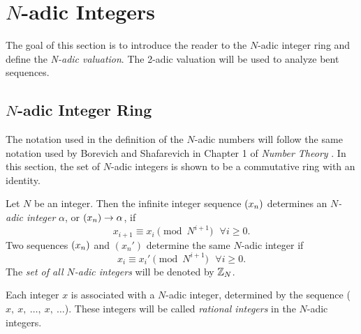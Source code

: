 \section{$N$-adic Integers}
\par The goal of this section is to introduce the reader to the $N$-adic
integer ring and define the {\em N-adic valuation}. The 2-adic valuation
will be used to analyze bent sequences.

\subsection{$N$-adic Integer Ring}
\par The notation used in the definition of the $N$-adic numbers will follow
the same notation used by Borevich and Shafarevich in Chapter 1 of
{\em Number Theory} \cite{bk:bs66}. In this section, the set of $N$-adic
integers is shown to be a commutative ring with an identity.
  
\begin{definition}
\label{def:N-adic}
  Let $N$ be an integer. Then the infinite integer sequence $(x_n)$
  determines an {\em $N$-adic integer} $\alpha$, or
  $(x_n) \rightarrow \alpha$, if
  \begin{equation} \label{eq:seq}
  x_{i+1} \equiv x_i\pmod{N^{i+1}} \ \ \ \forall i \geq 0.
  \end{equation}
  Two sequences $(x_n)$ and $(x_n')$ determine the same $N$-adic integer if 
\begin{equation} \label{eq:equiv}
  x_i \equiv x_i' \pmod{N^{i+1}}\ \ \ \forall i \geq 0.
\end{equation}
  The {\em set of all $N$-adic integers} will be denoted by $\mathbb{Z}_N$.
\end{definition}

\par Each integer $x$ is associated with a $N$-adic integer, determined
by the sequence ($x,\ x, \ \dots, \ x,\ \dots$). These integers will be
called {\em rational integers} in the $N$-adic integers.
	
